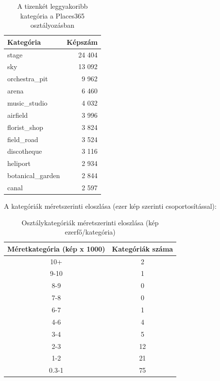         \begin{table}[H]
        \centering
        \caption{A tizenkét leggyakoribb kategória a Places365 osztályozásban}
        \begin{tabular}{|l|r|}
        \hline
        \textbf{Kategória} & \textbf{Képszám} \\
        \hline
        stage              & 24 404 \\
        sky                & 13 092 \\
        orchestra\_pit      & 9 962 \\
        arena              & 6 460 \\
        music\_studio       & 4 032 \\
        airfield           & 3 996 \\
        florist\_shop       & 3 824 \\
        field\_road         & 3 524 \\
        discotheque        & 3 116 \\
        heliport           & 2 934 \\
        botanical\_garden   & 2 844 \\
        canal              & 2 597 \\
        \hline
        \end{tabular}
        \label{tab:places365-top12}
        \end{table}

        A kategóriák méretszerinti eloszlása (ezer kép szerinti csoportosítással):

        \begin{table}[H]
        \centering
        \caption{Osztálykategóriák méretszerinti eloszlása (kép ezerfő/kategória)}
        \begin{tabular}{|c|c|}
        \hline
        \textbf{Méretkategória (kép x 1000)} & \textbf{Kategóriák száma} \\
        \hline
        10+     & 2 \\
        9-10    & 1 \\
        8-9     & 0 \\
        7-8     & 0 \\
        6-7     & 1 \\
        4-6     & 4 \\
        3-4     & 5 \\
        2-3     & 12 \\
        1-2     & 21 \\
        0.3-1   & 75 \\
        \hline
        \end{tabular}
        \label{tab:places365-size-dist}
        \end{table}

